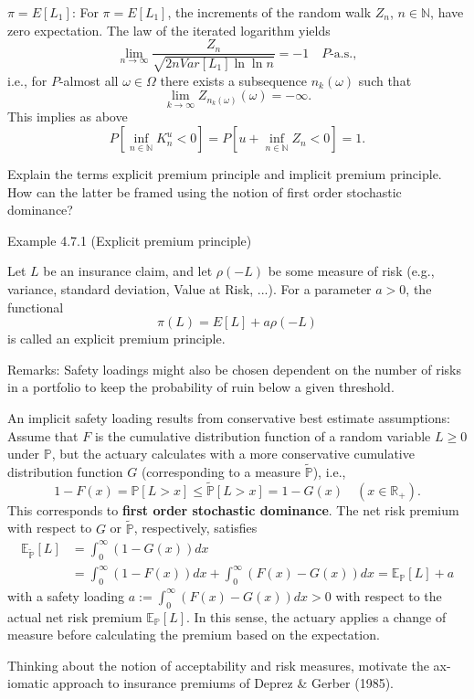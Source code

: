 \(\pi = E[L_1]\):
For \(\pi = E[L_1]\), the increments of the random walk \(Z_n\), \(n \in \mathbb{N}\), have zero expectation.
The law of the iterated logarithm yields
\[\lim_{n \rightarrow \infty} \frac{Z_n}{\sqrt{2nVar[L_1] \ln \ln n}} = -1 \quad P\text{-a.s.},\]
i.e., for \(P\)-almost all \(\omega \in \Omega\) there exists a subsequence \(n_k(\omega)\) such that
\[\lim_{k \rightarrow \infty} Z_{n_k(\omega)}(\omega) = -\infty.\]
This implies as above
\[P[\inf_{n \in \mathbb{N}} K_n^u < 0] = P[u + \inf_{n \in \mathbb{N}} Z_n < 0] = 1.\]


Explain the terms explicit premium principle and implicit premium principle. How
can the latter be framed using the notion of first order stochastic dominance?

Example 4.7.1 (Explicit premium principle)

Let \(L\) be an insurance claim, and let \(\rho(-L)\) be some measure of risk (e.g., variance, standard deviation, Value at Risk, ...). 
For a parameter \(a>0\), the functional
\[\pi(L) = E[L] + a\rho(-L)\]
is called an explicit premium principle.

Remarks:
Safety loadings might also be chosen dependent on the number of risks in a portfolio to keep the probability of ruin below a given threshold.

An implicit safety loading results from conservative best estimate assumptions:
Assume that \(F\) is the cumulative distribution function of a random variable \(L \geq 0\) under \(\mathbb{P}\), 
but the actuary calculates with a more conservative cumulative distribution function \(G\) (corresponding to a measure \(\tilde{\mathbb{P}}\)), 
i.e.,
\[1 - F(x) = \mathbb{P}[L>x] \leq \tilde{\mathbb{P}}[L>x] = 1 - G(x) \quad (x \in \mathbb{R}_+).\]
This corresponds to \textbf{first order stochastic dominance}.
The net risk premium with respect to \(G\) or \(\tilde{\mathbb{P}}\), respectively, satisfies
\begin{align*}
  \mathbb{E}_{\tilde{\mathbb{P}}}[L] &= \int_0^{\infty} (1-G(x))dx \\
    &= \int_0^{\infty} (1-F(x))dx + \int_0^{\infty} (F(x)-G(x))dx = \mathbb{E}_{\mathbb{P}}[L] + a
\end{align*}
with a safety loading \(a := \int_0^{\infty} (F(x)-G(x))dx > 0\) with respect to the actual net risk premium \(\mathbb{E}_{\mathbb{P}}[L]\).
In this sense, the actuary applies a change of measure before calculating the premium based on the expectation.


Thinking about the notion of acceptability and risk measures, motivate the ax-
iomatic approach to insurance premiums of Deprez & Gerber (1985).


